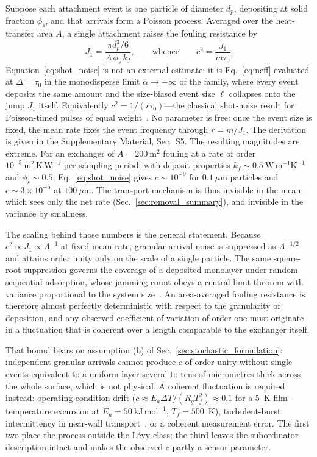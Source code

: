 \documentclass[preprint,12pt]{elsarticle}
\begin{document}
Suppose each attachment event is one particle of diameter $d_p$, depositing at solid
fraction $\phi_s$, and that arrivals form a Poisson
process. Averaged over the heat-transfer area $A$, a single attachment raises the fouling
resistance by
%
\begin{equation}
  J_1=\frac{\pi d_p^{3}/6}{A\,\phi_s\,k_f},
  \qquad\text{whence}\qquad
  c^{2}=\frac{J_1}{m\tau_0}.
  \label{eq:shot_noise}
\end{equation}
%
Equation~\eqref{eq:shot_noise} is not an external estimate: it is
Eq.~\eqref{eq:neff} evaluated at $\Delta=\tau_0$ in the monodisperse limit
$\alpha\to-\infty$ of the family, where every event deposits the same amount
and the size-biased event size $\ell$ collapses onto the jump $J_1$ itself.
Equivalently $c^{2}=1/(r\tau_0)$---the classical shot-noise result for Poisson-timed pulses of
equal weight~\cite{Rice1944,Rice1945}. No parameter is free: once the event
size is fixed, the mean rate fixes the event frequency through $r=m/J_1$. The
derivation is given in the Supplementary Material, Sec.~S5.
The resulting magnitudes are extreme. For an exchanger of $A=200~\mathrm{m^2}$
fouling at a rate of order $10^{-5}~\mathrm{m^{2}\,K\,W^{-1}}$ per sampling period, with deposit
properties $k_f\sim0.5~\mathrm{W\,m^{-1}K^{-1}}$ and $\phi_s\sim0.5$,
Eq.~\eqref{eq:shot_noise} gives $c\sim10^{-9}$ for $0.1~\mu\mathrm{m}$ particles
and $c\sim3\times10^{-5}$ at $100~\mu\mathrm{m}$. The transport mechanism
is thus invisible in the mean, which sees only the net rate
(Sec.~\ref{sec:removal_summary}), and invisible in the variance by smallness.

The scaling behind those numbers is the general statement. Because $c^{2}\propto J_1\propto A^{-1}$
at fixed mean rate, granular arrival noise is suppressed as $A^{-1/2}$ and attains order unity
only on the scale of a single particle. The same square-root suppression governs the coverage of a deposited
monolayer under random sequential adsorption, whose jamming count obeys a
central limit theorem with variance proportional to the system
size~\cite{Penrose2001,Loscar2003}. An area-averaged fouling resistance is therefore almost
perfectly deterministic with respect to the granularity of deposition, and any observed
coefficient of variation of order one must originate in a fluctuation that is coherent over a
length comparable to the exchanger itself.

That bound bears on assumption (b) of Sec.~\ref{sec:stochastic_formulation}: independent granular
arrivals cannot produce $c$ of order unity without single events equivalent to a uniform layer
several to tens of micrometres thick across the whole surface, which is not physical. A coherent fluctuation
is required instead: operating-condition drift ($c\approx E_a\Delta T/(R_gT_f^2)\approx0.1$ for a 5~K film-temperature
excursion at $E_a=50~\mathrm{kJ\,mol^{-1}}$, $T_f=500$~K), turbulent-burst intermittency in near-wall
transport~\cite{Vatistas1988,Nakagawa1978,Miele2025}, or a coherent measurement error. The first
two place the process outside the L\'evy class; the third leaves the subordinator description
intact and makes the observed $c$ partly a sensor parameter.
\end{document}
